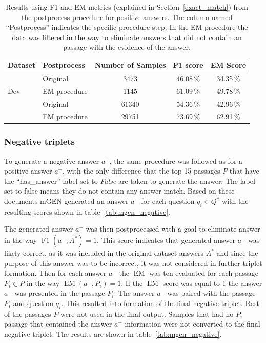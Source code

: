 \begin{table}[h]
    \centering
    \begin{tabular}{l|lccc}
        \hline
         Dataset & Postprocess & Number of Samples & F1 score & EM Score \\
        \hline
        \multirow{3}{*}{Dev} & Original & 3473 & 46.08\,\% & 34.35\,\% \\
         &  EM procedure & 1145 & 61.09\,\% & 49.78\,\% \\
         \hline
        \multirow{3}{*}{Train} & Original & 61340 &  54.36\,\% & 42.96\,\% \\
         & EM procedure & 29751 &  73.69\,\% & 62.91\,\% \\
        \hline
    \end{tabular}
    \caption{Results using F1 and EM metrics (explained in Section~\ref{exact_match}) from the postprocess procedure for positive answers. The column named ``Postprocess'' indicates the specific procedure step. In the EM procedure the data was filtered in the way to eliminate answers that did not contain an passage with the evidence of the answer.}
    \label{tab:mgen_positive}
\end{table}

\subsubsection*{Negative triplets}
To generate a negative answer $a^-$, the same procedure was followed as for a positive answer $a^+$, with the only difference that the top 15 passages $P$ that have the ``has\_answer'' label set to \emph{False} are taken to generate the answer. The label set to false means they do not contain any answer match. Based on these documents mGEN generated an answer $a^-$ for each question $q_i \in Q^*$ with the resulting scores shown in table~\ref{tab:mgen_negative}.

The generated answer $a^-$ was then postprocessed with a goal to eliminate answer in the way $\operatorname{F1}(a^-, A^*) = 1$. This score indicates that generated answer $a^-$ was likely correct, as it was included in the original dataset answers $A^*$ and since the purpose of this answer was to be incorrect, it was not considered in further triplet formation. Then for each answer $a^-$ the $\operatorname{EM}$ was ten evaluated for each passage $P_i \in P$ in the way $\operatorname{EM}(a^-, P_i) = 1$. If the $\operatorname{EM}$ score was equal to 1 the answer $a^-$ was presented in the passage $P_i$. The answer $a^-$ was paired with the passage $P_i$ and question $q_i$. This resulted into formation of the final negative triplet. Rest of the passages $P$ were not used in the final output. Samples that had no $P_i$ passage that contained the answer $a^-$ information were not converted to the final negative triplet. The results are shown in table~\ref{tab:mgen_negative}.

